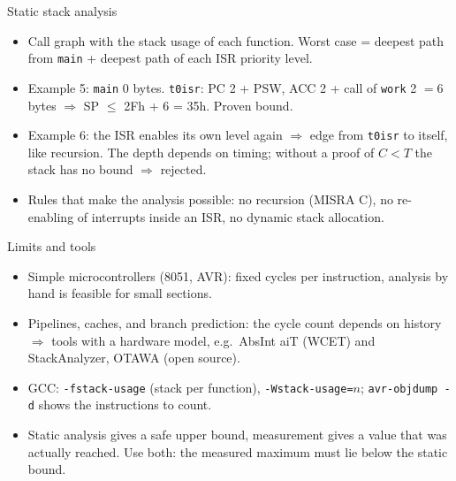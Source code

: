 \begin{frame}{Static stack analysis}
  \begin{itemize}
    \item Call graph with the stack usage of each function. Worst case = deepest path from \texttt{main} + deepest path of each ISR priority level.
    \item Example 5: \texttt{main} 0 bytes. \texttt{t0isr}: PC 2 + PSW, ACC 2 + call of \texttt{work} 2 $= 6$ bytes $\Rightarrow$ SP $\le$ 2Fh + 6 = 35h. Proven bound.
    \item Example 6: the ISR enables its own level again $\Rightarrow$ edge from \texttt{t0isr} to itself, like recursion. The depth depends on timing; without a proof of $C < T$ the stack has no bound $\Rightarrow$ rejected.
    \item Rules that make the analysis possible: no recursion (MISRA C), no re-enabling of interrupts inside an ISR, no dynamic stack allocation.
  \end{itemize}
\end{frame}

\begin{frame}{Limits and tools}
  \begin{itemize}
    \item Simple microcontrollers (8051, AVR): fixed cycles per instruction, analysis by hand is feasible for small sections.
    \item Pipelines, caches, and branch prediction: the cycle count depends on history $\Rightarrow$ tools with a hardware model, e.g.\ AbsInt aiT (WCET) and StackAnalyzer, OTAWA (open source).
    \item GCC: \texttt{-fstack-usage} (stack per function), \texttt{-Wstack-usage=}$n$; \texttt{avr-objdump -d} shows the instructions to count.
    \item Static analysis gives a safe upper bound, measurement gives a value that was actually reached. Use both: the measured maximum must lie below the static bound.
  \end{itemize}
\end{frame}

